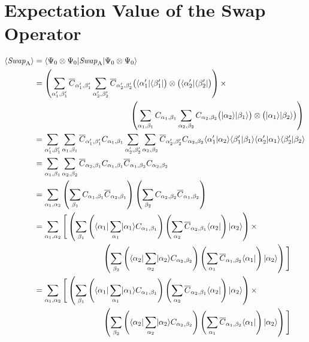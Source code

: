 \chapter{Expectation Value of the Swap Operator}
\label{swaperator}

\begin{align}
\langle \SWA \rangle &=
\bra{\Psi_0\otimes\Psi_0}\SWA \ket{\Psi_0\otimes\Psi_0} \\ &= \nonumber
	\left(\sum_{\alpha'_1,\beta'_1}
		\overline{C}_{\alpha'_1,\beta'_1}\sum_{\alpha'_2,\beta'_2} 
		\overline{C}_{\alpha'_2,\beta'_2}
			\big(\bra{\alpha'_1}\bra{\beta'_1}\big)\otimes\big(\bra{\alpha'_2}\bra{\beta'_2}\big)
			  \right) \times \\ 
	& \hspace{4.2cm}
		\left( \sum_{\alpha_1,\beta_1}C_{\alpha_1,\beta_1}\sum_{\alpha_2,\beta_2} 
			C_{\alpha_2,\beta_2}
			\big(\ket{\alpha_2}\ket{\beta_1}\big)\otimes
			\big(\ket{\alpha_1}\ket{\beta_2}\big) \right) \\
	&=\sum_{\alpha'_1,\beta'_1}\sum_{\alpha_1,\beta_1}
		\overline{C}_{\alpha'_1,\beta'_1}C_{\alpha_1,\beta_1}
		\sum_{\alpha'_2,\beta'_2}\sum_{\alpha_2,\beta_2} 
		\overline{C}_{\alpha'_2,\beta'_2}C_{\alpha_2,\beta_2}
		\inn{\alpha'_1}{\alpha_2}\inn{\beta'_1}{\beta_1}
		\inn{\alpha'_2}{\alpha_1}\inn{\beta'_2}{\beta_2} \\
	&=\sum_{\alpha_1,\beta_1} \sum_{\alpha_2,\beta_2}
		\overline{C}_{\alpha_2,\beta_1}C_{\alpha_1,\beta_1}
		\overline{C}_{\alpha_1,\beta_2}C_{\alpha_2,\beta_2}\\
	&= \sum_{\alpha_1,\alpha_2} \left( \sum_{\beta_1}
		 C_{\alpha_1,\beta_1} \overline{C}_{\alpha_2,\beta_1}\right) 
		 \left( \sum_{\beta_2} C_{\alpha_2,\beta_2} \overline{C}_{\alpha_1,\beta_2}\right) \\
	&= \sum_{\alpha_1,\alpha_2} \Bigg[ \left(  \nonumber
		\sum_{\beta_1}  \left( \bra{\alpha_1}
		\sum_{\alpha_1} \ket{\alpha_1}  C_{\alpha_1,\beta_1} \right)
		\left( \sum_{\alpha_2}  \overline{C}_{\alpha_2,\beta_1}\bra{\alpha_2} \right)
		\ket{\alpha_2}\right) \times\\
		&\hspace{3cm}
		 \left( \sum_{\beta_2} \left( \bra{\alpha_2} \sum_{\alpha_2} \ket{\alpha_2} 
		 C_{\alpha_2,\beta_2} \right) \left( \sum_{\alpha_1} \overline{C}_{\alpha_1,\beta_2} 
		 \bra{\alpha_1} \right) \ket{\alpha_2} \right) \Bigg] \\	
	&= \sum_{\alpha_1,\alpha_2} \Bigg[ \left(  \nonumber
		\sum_{\beta_1}  \left( \bra{\alpha_1}
		\sum_{\alpha_1} \ket{\alpha_1}  C_{\alpha_1,\beta_1} \right)
		\left( \sum_{\alpha_2}  \overline{C}_{\alpha_2,\beta_1}\bra{\alpha_2} \right)
		\ket{\alpha_2}\right) \times\\
		&\hspace{3cm}
		 \left( \sum_{\beta_2} \left( \bra{\alpha_2} \sum_{\alpha_2} \ket{\alpha_2} 
		 C_{\alpha_2,\beta_2} \right) \left( \sum_{\alpha_1} \overline{C}_{\alpha_1,\beta_2} 
		 \bra{\alpha_1} \right) \ket{\alpha_2} \right) \Bigg] \\	
\end{align}